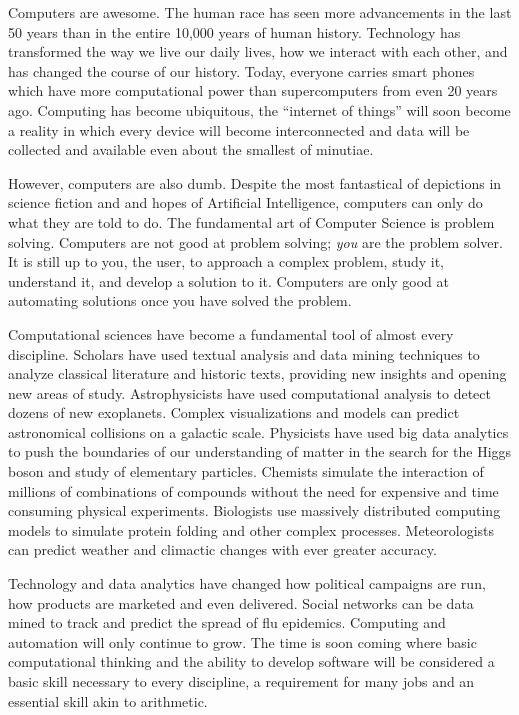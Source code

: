 

Computers are awesome.  The human race has seen more advancements in the 
last 50 years than in the entire 10,000 years of human history.  Technology has
transformed the way we live our daily lives, how we interact with each other, and
has changed the course of our history.  Today, everyone carries smart phones
which have more computational power than supercomputers from even 20 years ago.
Computing has become ubiquitous, the ``internet of things'' will soon become
a reality in which every device will become interconnected and data will be collected
and available even about the smallest of minutiae.

However, computers are also dumb.  Despite the most fantastical of depictions
in science fiction and and hopes of Artificial Intelligence, computers can only do 
what they are told to do.  The fundamental art of Computer Science is problem 
solving.  Computers are not good at problem solving; \emph{you} are the problem 
solver.  It is still up to you, the user, to approach a complex problem, study it, 
understand it, and develop a solution to it.  Computers are only good at automating 
solutions once you have solved the problem.

Computational sciences have become a fundamental tool of almost every
discipline.  Scholars have used textual analysis and data mining techniques to
analyze classical literature and historic texts, providing new insights and opening
new areas of study.  Astrophysicists have used computational analysis to
detect dozens of new exoplanets.  Complex visualizations and models can 
predict astronomical collisions on a galactic scale.  Physicists have used big 
data analytics to push the boundaries of our understanding of matter in the 
search for the Higgs boson and study of elementary particles.  Chemists 
simulate the interaction of millions of combinations of compounds without
the need for expensive and time consuming physical experiments.  
Biologists use massively distributed computing models to simulate 
protein folding and other complex processes.  Meteorologists can 
predict weather and climactic changes with ever greater accuracy.

Technology and data analytics have changed how political campaigns
are run, how products are marketed and even delivered.
Social networks can be data mined to track and predict the spread of flu
epidemics.  Computing and automation will only continue to grow.
The time is soon coming where basic computational thinking and the 
ability to develop software will be considered a basic skill necessary 
to every discipline, a requirement for many jobs and an 
essential skill akin to arithmetic.

